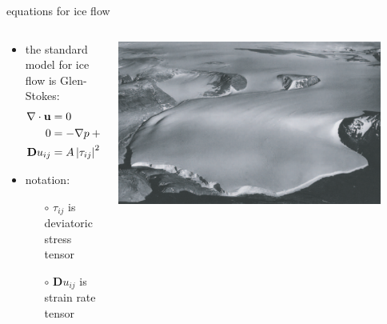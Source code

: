 \documentclass[10pt,hyperref={pdfpagelabels=true}]{beamer}
\begin{document}
\begin{frame}{equations for ice flow}

\begin{columns}
\begin{column}{0.65\textwidth}
\begin{itemize}
\item the \alert{standard model for ice flow} is Glen-Stokes:
\begin{align*}
\nabla \cdot \mathbf{u} &= 0 &&\text{\emph{incompressibility}} \\
0 &= - \nabla p + \nabla \cdot \tau_{ij} + \rho \mathbf{g} &&\text{\emph{stress balance}} \\
\mathbf{D}u_{ij} &= A \left|\tau_{ij}\right|^2 \tau_{ij} &&\text{\emph{flow law}}
\end{align*}
\item notation:
  \begin{itemize}
  \item[$\circ$] $\tau_{ij}$ is deviatoric stress tensor
  \item[$\circ$] $\mathbf{D}u_{ij}$ is strain rate tensor
  \end{itemize}
\end{itemize}
\end{column}
\begin{column}{0.35\textwidth}

\hfill\includegraphics[width=0.9\textwidth]{polaris}

\bigskip\bigskip


\end{column}
\end{columns}
\end{frame}
\end{document}
